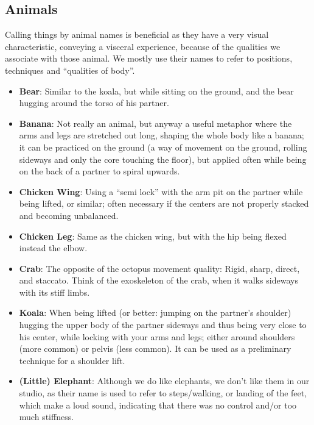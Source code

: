 \subsection{Animals}\label{subsec:animals}

Calling things by animal names is beneficial as they have a very visual characteristic, conveying a visceral experience, because of the qualities we associate with those animal.
We mostly use their names to refer to positions, techniques and ``qualities of body''.

\begin{itemize}
    \item \textbf{Bear}: Similar to the koala, but while sitting on the ground, and the bear hugging around the torso of his partner.
    \item \textbf{Banana}: Not really an animal, but anyway a useful metaphor where the arms and legs are stretched out long, shaping the whole body like a banana; it can be practiced on the ground (a way of movement on the ground, rolling sideways and only the core touching the floor), but applied often while being on the back of a partner to spiral upwards.
    \item \textbf{Chicken Wing}: Using a ``semi lock'' with the arm pit on the partner while being lifted, or similar; often necessary if the centers are not properly stacked and becoming unbalanced.
    \item \textbf{Chicken Leg}: Same as the chicken wing, but with the hip being flexed instead the elbow.
    \item \textbf{Crab}: The opposite of the octopus movement quality: Rigid, sharp, direct, and staccato.
    Think of the exoskeleton of the crab, when it walks sideways with its stiff limbs.
    \item \textbf{Koala}: When being lifted (or better: jumping on the partner's shoulder) hugging the upper body of the partner sideways and thus being very close to his center, while locking with your arms and legs; either around shoulders (more common) or pelvis (less common).
    It can be used as a preliminary technique for a shoulder lift.
    \item \textbf{(Little) Elephant}: Although we do like elephants, we don't like them in our studio, as their name is used to refer to steps/walking, or landing of the feet, which make a loud sound, indicating that there was no control and/or too much stiffness.

\end{itemize}
